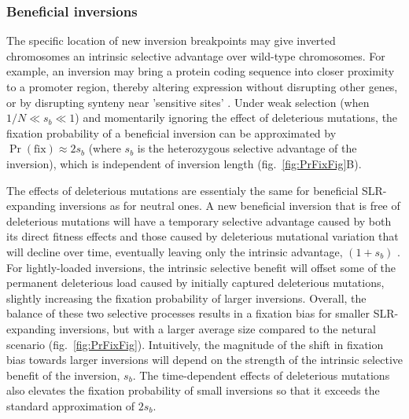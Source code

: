 \documentclass{article}[12pt]
\begin{document}
\subsubsection*{Beneficial inversions}

The specific location of new inversion breakpoints may give inverted chromosomes an intrinsic selective advantage over wild-type chromosomes. For example, an inversion may bring a protein coding sequence into closer proximity to a promoter region, thereby altering expression without disrupting other genes, or by disrupting synteny near 'sensitive sites' \citep{KrimbasPowell1992, CorbettDetig2016}. Under weak selection (when $1/N \ll s_b \ll 1$) and momentarily ignoring the effect of deleterious mutations, the fixation probability of a beneficial inversion can be approximated by $\Pr(\text{fix}) \approx 2 s_{b}$ \citep{Haldane1927} (where $s_b$ is the heterozygous selective advantage of the inversion), which is independent of inversion length (fig.~\ref{fig:PrFixFig}B).

The effects of deleterious mutations are essentialy the same for beneficial SLR-expanding inversions as for neutral ones. A new beneficial inversion that is free of deleterious mutations will have a temporary selective advantage caused by both its direct fitness effects and those caused by deleterious mutational variation that will decline over time, eventually leaving only the intrinsic advantage, $(1 + s_b)$ \citep{Nei1967}. For lightly-loaded inversions, the intrinsic selective benefit will offset some of the permanent deleterious load caused by initially captured deleterious mutations, slightly increasing the fixation probability of larger inversions. Overall, the balance of these two selective processes results in a fixation bias for smaller SLR-expanding inversions, but with a larger average size compared to the netural scenario (fig.~\ref{fig:PrFixFig}). Intuitively, the magnitude of the shift in fixation bias towards larger inversions will depend on the strength of the intrinsic selective benefit of the inversion, $s_b$. The time-dependent effects of deleterious mutations also elevates the fixation probability of small inversions so that it exceeds the standard approximation of $2s_b$.
\end{document}
